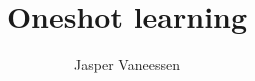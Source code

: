 \documentclass[]{article}
\title{Oneshot learning}
\author{Jasper Vaneessen}
\begin{document}
\maketitle

\begin{abstract}

\end{abstract}

\section{}
\end{document}
